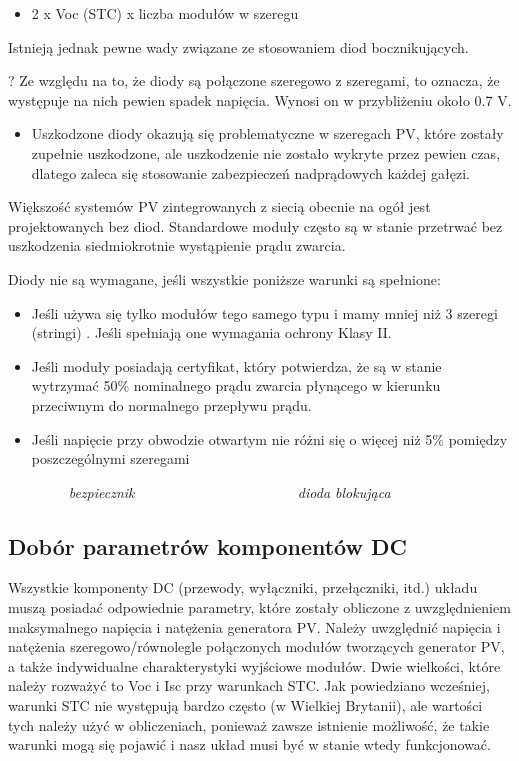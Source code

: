 \documentclass[12pt,a4paper]{article}
\begin{document}
\begin{itemize}
\item 2 x Voc (STC) x liczba modułów w szeregu 
\end{itemize}
Istnieją jednak pewne wady związane ze stosowaniem diod bocznikujących. 

? Ze względu na to, że diody są połączone szeregowo z szeregami, to 
oznacza, że występuje na nich pewien spadek napięcia. Wynosi on w 
przybliżeniu około 0.7 V. 

\begin{itemize}
\item Uszkodzone diody okazują się problematyczne w szeregach PV, które 
zostały zupełnie uszkodzone, ale uszkodzenie nie zostało wykryte przez 
pewien czas, dlatego zaleca się stosowanie zabezpieczeń nadprądowych 
każdej gałęzi. 
\end{itemize}
Większość systemów PV zintegrowanych z siecią obecnie na ogół jest 
projektowanych bez diod. Standardowe moduły często są w stanie przetrwać 
bez uszkodzenia siedmiokrotnie wystąpienie prądu zwarcia. 

Diody nie są wymagane, jeśli wszystkie poniższe warunki są spełnione: 

\begin{itemize}
\item Jeśli używa się tylko modułów tego samego typu i mamy mniej niż 3 
szeregi (stringi) . Jeśli spełniają one wymagania ochrony Klasy II. 
\item Jeśli moduły posiadają certyfikat, który potwierdza, że są w 
stanie wytrzymać 50\% nominalnego prądu zwarcia płynącego w kierunku 
przeciwnym do normalnego przepływu prądu. 
\item Jeśli napięcie przy obwodzie otwartym nie różni się o więcej niż 
5\% pomiędzy poszczególnymi szeregami 
\end{itemize}


 

\textit{ }\ \ \ \ \textit{ }\ \ \ \ \textit{bezpiecznik }\ \ \ \ 
\textit{ }\ \ \ \ \textit{ }\ \ \ \ \textit{ }\ \ \ \ \textit{ }\ \ 
\ \ \textit{dioda blokująca }

\subsection{Dobór parametrów komponentów DC }


Wszystkie komponenty DC (przewody, wyłączniki, przełączniki, itd.) 
układu muszą posiadać odpowiednie parametry, które zostały obliczone z 
uwzględnieniem maksymalnego napięcia i natężenia generatora PV. Należy 
uwzględnić napięcia i natężenia szeregowo/równolegle połączonych modułów 
tworzących generator PV, a także indywidualne charakterystyki wyjściowe 
modułów. Dwie wielkości, które należy rozważyć to Voc i Isc przy 
warunkach STC. Jak powiedziano wcześniej, warunki STC nie występują 
bardzo często (w Wielkiej Brytanii), ale wartości tych należy użyć w 
obliczeniach, ponieważ zawsze istnienie możliwość, że takie warunki mogą 
się pojawić i nasz układ musi być w stanie wtedy funkcjonować. 
\end{document}
